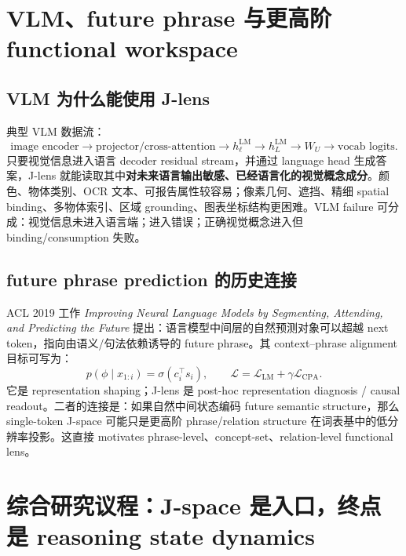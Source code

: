 \documentclass[10.5pt,a4paper]{ctexart}
\begin{document}
\section{VLM、future phrase 与更高阶 functional workspace}

\subsection{VLM 为什么能使用 J-lens}
典型 VLM 数据流：
\[
\text{image encoder}
\rightarrow
\text{projector/cross-attention}
\rightarrow
h_\ell^{\mathrm{LM}}
\rightarrow
h_L^{\mathrm{LM}}
\rightarrow
W_U
\rightarrow
\text{vocab logits}.
\]
只要视觉信息进入语言 decoder residual stream，并通过 language head 生成答案，J-lens 就能读取其中\textbf{对未来语言输出敏感、已经语言化的视觉概念成分}。颜色、物体类别、OCR 文本、可报告属性较容易；像素几何、遮挡、精细 spatial binding、多物体索引、区域 grounding、图表坐标结构更困难。VLM failure 可分成：视觉信息未进入语言端；进入错误；正确视觉概念进入但 binding/consumption 失败。

\subsection{future phrase prediction 的历史连接}
ACL 2019 工作 \emph{Improving Neural Language Models by Segmenting, Attending, and Predicting the Future} 提出：语言模型中间层的自然预测对象可以超越 next token，指向由语义/句法依赖诱导的 future phrase。其 context--phrase alignment 目标可写为：
\[
p(\phi\mid x_{1:i})=\sigma(c_i^\top s_i),
\qquad
\mathcal L=\mathcal L_{\mathrm{LM}}+\gamma\mathcal L_{\mathrm{CPA}}.
\]
它是 representation shaping；J-lens 是 post-hoc representation diagnosis / causal readout。二者的连接是：如果自然中间状态编码 future semantic structure，那么 single-token J-space 可能只是更高阶 phrase/relation structure 在词表基中的低分辨率投影。这直接 motivates phrase-level、concept-set、relation-level functional lens。

\section{综合研究议程：J-space 是入口，终点是 reasoning state dynamics}
\end{document}
